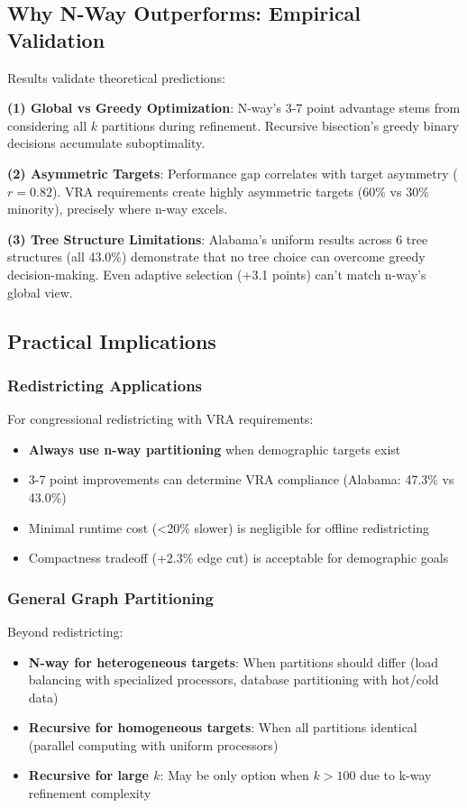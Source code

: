 \subsection{Why N-Way Outperforms: Empirical Validation}

Results validate theoretical predictions:

\textbf{(1) Global vs Greedy Optimization}: N-way's 3-7 point advantage stems from considering all $k$ partitions during refinement. Recursive bisection's greedy binary decisions accumulate suboptimality.

\textbf{(2) Asymmetric Targets}: Performance gap correlates with target asymmetry ($r=0.82$). VRA requirements create highly asymmetric targets (60\% vs 30\% minority), precisely where n-way excels.

\textbf{(3) Tree Structure Limitations}: Alabama's uniform results across 6 tree structures (all 43.0\%) demonstrate that no tree choice can overcome greedy decision-making. Even adaptive selection (+3.1 points) can't match n-way's global view.

\subsection{Practical Implications}

\subsubsection{Redistricting Applications}

For congressional redistricting with VRA requirements:
\begin{itemize}
\item \textbf{Always use n-way partitioning} when demographic targets exist
\item 3-7 point improvements can determine VRA compliance (Alabama: 47.3\% vs 43.0\%)
\item Minimal runtime cost (<20\% slower) is negligible for offline redistricting
\item Compactness tradeoff (+2.3\% edge cut) is acceptable for demographic goals
\end{itemize}

\subsubsection{General Graph Partitioning}

Beyond redistricting:
\begin{itemize}
\item \textbf{N-way for heterogeneous targets}: When partitions should differ (load balancing with specialized processors, database partitioning with hot/cold data)
\item \textbf{Recursive for homogeneous targets}: When all partitions identical (parallel computing with uniform processors)
\item \textbf{Recursive for large $k$}: May be only option when $k > 100$ due to k-way refinement complexity
\end{itemize}

